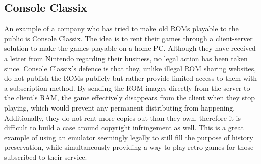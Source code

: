 \subsection{Console Classix}
An example of a company who has tried to make old ROMs playable to the public is Console Classix\cite{romLegal}. The idea is to rent their games through a client-server solution to make the games playable on a home PC. Although they have received a letter from Nintendo regarding their business\cite{letterFromNintendo}, no legal action has been taken since. Console Classix's defence is that they, unlike illegal ROM sharing websites, do not publish the ROMs publicly but rather provide limited access to them with a subscription method. By sending the ROM images directly from the server to the client's RAM, the game effectively disappears from the client when they stop playing, which would prevent any permanent distributing from happening. Additionally, they do not rent more copies out than they own, therefore it is difficult to build a case around copyright infringement as well. This is a great example of using an emulator seemingly legally to still fill the purpose of history preservation, while simultaneously providing a way to play retro games for those subscribed to their service.






